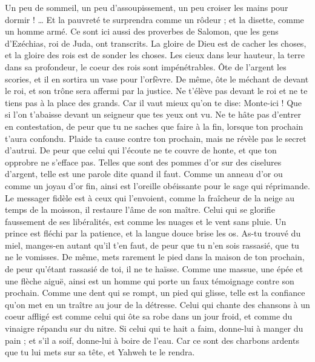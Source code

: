\begin{multicols}{2}
Un peu de sommeil, un peu d’assoupissement, un peu croiser les mains pour dormir ! …
Et la pauvreté te surprendra comme un rôdeur ; et la disette, comme un homme armé.
\VerseOne{}Ce sont ici aussi des proverbes de Salomon, que les gens d'Ezéchias, roi de Juda, ont transcrits.
La gloire de Dieu est de cacher les choses, et la gloire des rois est de sonder les choses.
Les cieux dans leur hauteur, la terre dans sa profondeur, le coeur des rois sont impénétrables.
Ôte de l'argent les scories, et il en sortira un vase pour l’orfèvre.
 De même, ôte le méchant de devant le roi, et son trône sera affermi par la justice.
Ne t’élève pas devant le roi et ne te tiens pas à la place des grands.
Car il vaut mieux qu'on te dise: Monte-ici ! Que si l’on t'abaisse devant un seigneur que tes yeux ont vu.
Ne te hâte pas d’entrer en contestation, de peur que tu ne saches que faire à la fin, lorsque ton prochain t'aura confondu.
Plaide ta cause contre ton prochain, mais ne révèle pas le secret d'autrui.
De peur que celui qui l'écoute ne te couvre de honte, et que ton opprobre ne s'efface pas.
Telles que sont des pommes d'or sur des ciselures d'argent, telle est une parole dite quand il faut.
Comme un anneau d'or ou comme un joyau d’or fin, ainsi est l’oreille obéissante pour le sage qui réprimande.
Le messager fidèle est à ceux qui l'envoient, comme la fraîcheur de la neige au temps de la moisson, il restaure l'âme de son maître.
Celui qui se glorifie faussement de ses libéralités, est comme les nuages et le vent sans pluie.
Un prince est fléchi par la patience, et la langue douce brise les os.
As-tu trouvé du miel, manges-en autant qu'il t’en faut, de peur que tu n'en sois rassasié, que tu ne le vomisses.
De même, mets rarement le pied dans la maison de ton prochain, de peur qu'étant rassasié de toi, il ne te haïsse.
Comme une massue, une épée et une flèche aiguë, ainsi est un homme qui porte un faux témoignage contre son prochain.
Comme une dent qui se rompt, un pied qui glisse, telle est la confiance qu'on met en un traître au jour de la détresse.
Celui qui chante des chansons à un coeur affligé est comme celui qui ôte sa robe dans un jour froid, et comme du vinaigre répandu sur du nitre.
Si celui qui te hait a faim, donne-lui à manger du pain ; et s'il a soif, donne-lui à boire de l'eau.
Car ce sont des charbons ardents que tu lui mets sur sa tête, et Yahweh te le rendra.

\end{multicols}
